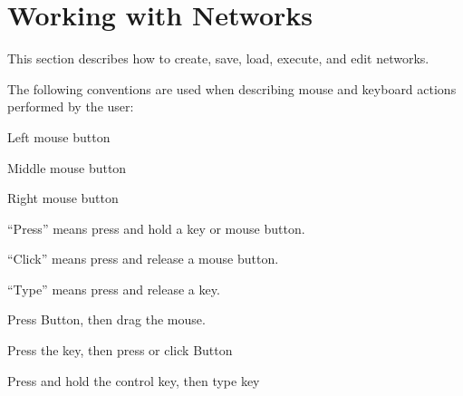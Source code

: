 %
% 
% 
% 
% 
% 
%


\chapter{Working with Networks}
\label{ch:workwithnets}

This section describes how to create, save, load, execute, and edit
networks.

The following conventions are used when describing mouse and keyboard
actions performed by the user:

\begin{description}
 Left mouse button

 Middle mouse button

 Right mouse button

 ``Press'' means press and hold a key or mouse button.

 ``Click'' means press and release a mouse button.

 ``Type''  means press and release a key.

 Press Button,
then drag the mouse.

 Press the  key,
then press or click Button

 Press and hold the control key, then
type key 
\end{description}


